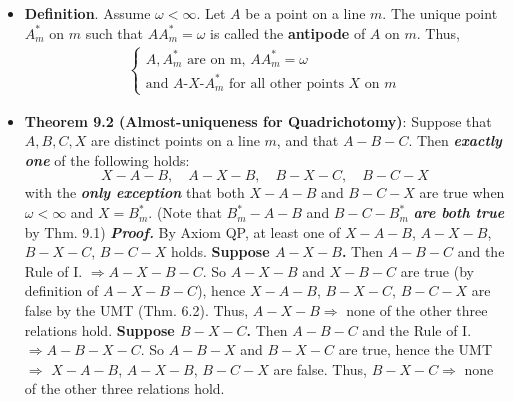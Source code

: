 \documentclass{report}
\begin{document}
\begin{itemize}
            \bigbreak \noindent 
            \endpf
        \item \textbf{Definition}. Assume $\omega < \infty$. Let $A$ be a point on a line $m$. The unique point $A_{m}^{*}$ on $m$ such that $AA_{m}^{*} = \omega$ is called the \textbf{antipode} of $A$ on $m$. Thus,
            \begin{align*}
                \begin{cases}
                    A,A_{m}^{*} \text{ are on m, }  AA_{m}^{*} = \omega \\
                    \text{and } A\text{-}X\text{-}A_{m}^{*} \text{ for all other points $X$ on $m$}
                \end{cases}
            \end{align*}
        \item \textbf{Theorem 9.2 (Almost-uniqueness for Quadrichotomy)}:  
            Suppose that \( A, B, C, X \) are distinct points on a line \( m \),  
            and that \( A - B - C \). Then \textbf{\textit{exactly one}} of the following holds:  
            \[
                X - A - B, \quad A - X - B, \quad B - X - C, \quad B - C - X
            \]
            with the \textbf{\textit{only exception}} that both \( X - A - B \) and \( B - C - X \) are true  
            when \( \omega < \infty \) and \( X = B_m^* \).
            \bigbreak \noindent 
            (Note that \( B_m^* - A - B \) and \( B - C - B_m^* \) \textbf{\textit{are both true}} by Thm. 9.1)
            \bigbreak \noindent 
            \textbf{\textit{Proof.}} 
            By Axiom QP, at least one of \( X - A - B \), \( A - X - B \), \( B - X - C \), \( B - C - X \) holds.
            \bigbreak \noindent 
            \textbf{Suppose \( A - X - B \).} Then \( A - B - C \) and the Rule of I. \( \Rightarrow A - X - B - C \).  
            \bigbreak \noindent 
            So \( A - X - B \) and \( X - B - C \) are true (by definition of \( A - X - B - C \)),  
            hence \( X - A - B \), \( B - X - C \), \( B - C - X \) are false by the UMT (Thm. 6.2).  
            Thus, \( A - X - B \Rightarrow \) none of the other three relations hold.
            \bigbreak \noindent 
            \textbf{Suppose \( B - X - C \).} Then \( A - B - C \) and the Rule of I. \( \Rightarrow A - B - X - C \).  
            \bigbreak \noindent 
            So \( A - B - X \) and \( B - X - C \) are true, hence the UMT \( \Rightarrow \)  
            \( X - A - B \), \( A - X - B \), \( B - C - X \) are false.  
            \bigbreak \noindent 
            Thus, \( B - X - C \Rightarrow \) none of the other three relations hold.

\end{itemize}
\end{document}
